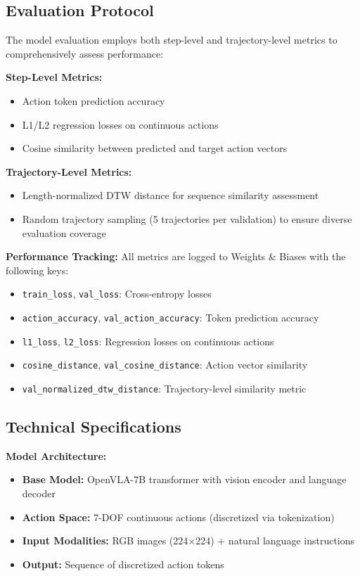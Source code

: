 \subsection{Evaluation Protocol}

The model evaluation employs both step-level and trajectory-level metrics to comprehensively assess performance:

\textbf{Step-Level Metrics:}
\begin{itemize}
    \item Action token prediction accuracy
    \item L1/L2 regression losses on continuous actions
    \item Cosine similarity between predicted and target action vectors
\end{itemize}

\textbf{Trajectory-Level Metrics:}
\begin{itemize}
    \item Length-normalized DTW distance for sequence similarity assessment
    \item Random trajectory sampling (5 trajectories per validation) to ensure diverse evaluation coverage
\end{itemize}

\textbf{Performance Tracking:} All metrics are logged to Weights \& Biases with the following keys:
\begin{itemize}
    \item \texttt{train\_loss}, \texttt{val\_loss}: Cross-entropy losses
    \item \texttt{action\_accuracy}, \texttt{val\_action\_accuracy}: Token prediction accuracy
    \item \texttt{l1\_loss}, \texttt{l2\_loss}: Regression losses on continuous actions
    \item \texttt{cosine\_distance}, \texttt{val\_cosine\_distance}: Action vector similarity
    \item \texttt{val\_normalized\_dtw\_distance}: Trajectory-level similarity metric
\end{itemize}

\subsection{Technical Specifications}

\textbf{Model Architecture:}
\begin{itemize}
    \item \textbf{Base Model:} OpenVLA-7B transformer with vision encoder and language decoder
    \item \textbf{Action Space:} 7-DOF continuous actions (discretized via tokenization)
    \item \textbf{Input Modalities:} RGB images (224×224) + natural language instructions
    \item \textbf{Output:} Sequence of discretized action tokens
\end{itemize}

